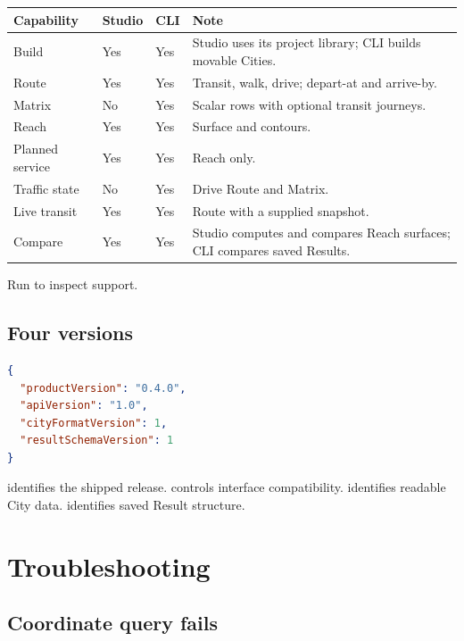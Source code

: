 \documentclass[10pt,letterpaper]{article}
\begin{document}
\begin{center}
\begin{tabularx}{\linewidth}{P{1.55in} Z Z Y}
\toprule
\textbf{Capability} & \textbf{Studio} & \textbf{CLI} & \textbf{Note} \\
\midrule
Build & Yes & Yes & Studio uses its project library; CLI builds movable Cities. \\
Route & Yes & Yes & Transit, walk, drive; depart-at and arrive-by. \\
Matrix & No & Yes & Scalar rows with optional transit journeys. \\
Reach & Yes & Yes & Surface and contours. \\
Planned service & Yes & Yes & Reach only. \\
Traffic state & No & Yes & Drive Route and Matrix. \\
Live transit & Yes & Yes & Route with a supplied snapshot. \\
Compare & Yes & Yes & Studio computes and compares Reach surfaces; CLI compares saved Results. \\
\bottomrule
\end{tabularx}
\end{center}

Run  to inspect support.

\subsection{Four versions}

\begin{lstlisting}[language=json]
{
  "productVersion": "0.4.0",
  "apiVersion": "1.0",
  "cityFormatVersion": 1,
  "resultSchemaVersion": 1
}
\end{lstlisting}

 identifies the shipped release.  controls interface compatibility.  identifies readable City data.  identifies saved Result structure.

\section{Troubleshooting}

\subsection{Coordinate query fails}
\end{document}

